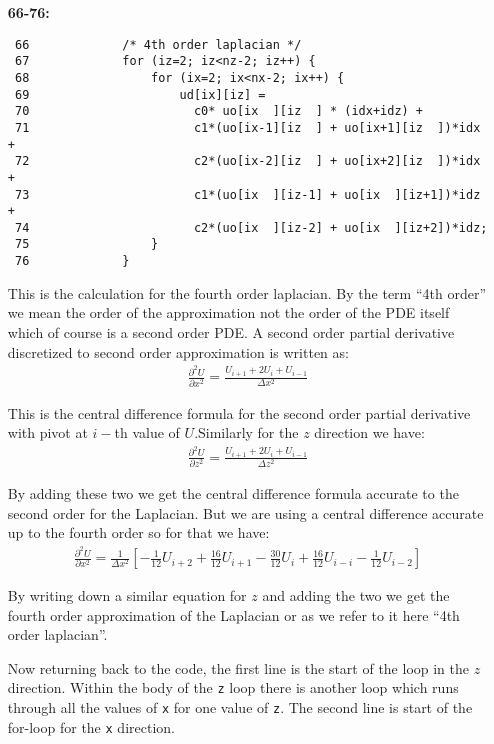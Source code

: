 \begin{itemize}
\item [\bf 66-76:]
\begin{verbatim}
 66             /* 4th order laplacian */
 67             for (iz=2; iz<nz-2; iz++) {
 68                 for (ix=2; ix<nx-2; ix++) {
 69                     ud[ix][iz] = 
 70                       c0* uo[ix  ][iz  ] * (idx+idz) + 
 71                       c1*(uo[ix-1][iz  ] + uo[ix+1][iz  ])*idx +
 72                       c2*(uo[ix-2][iz  ] + uo[ix+2][iz  ])*idx +
 73                       c1*(uo[ix  ][iz-1] + uo[ix  ][iz+1])*idz +
 74                       c2*(uo[ix  ][iz-2] + uo[ix  ][iz+2])*idz;	  
 75                 }
 76             }
\end{verbatim}

This is the calculation for the fourth order laplacian. By the term ``4th order'' we mean the order of the approximation not the order of the PDE itself which of course is a second order PDE. A second order partial derivative discretized to second order approximation is written as:
\begin{gather*}
    \frac{\partial^2U}{\partial x^2} = \frac{U_{i+1} + 2U_i + U_{i-1}}{\Delta x^2}
\end{gather*}
     
This is the central difference formula for the second order partial derivative with pivot at $i-$th value of $U$.Similarly for the $z$ direction we have:
\begin{gather*}
    \frac{\partial^2U}{\partial z^2} = \frac{U_{i+1} + 2U_i + U_{i-1}}{\Delta z^2}
\end{gather*}

By adding these two we get the central difference formula accurate to the second order for the Laplacian. But we are using a central difference accurate up to the fourth order so for that          we have:
\begin{gather*}
    \frac{\partial^2U}{\partial x^2} = \frac{1}{\Delta x^2}
                                       \left[-\frac{1}{12}U_{i+2}+ \frac{16}{12}U_{i+1} 
                                         -\frac{30}{12}U_i   + \frac{16}{12}U_{i-i} 
                                         - \frac{1}{12}U_{i-2}\right]
\end{gather*}

By writing down a similar equation for $z$ and adding the two  we get the fourth order approximation of the Laplacian or as we refer to it here ``4th order laplacian''.

Now returning back to the code, the first line is the start of the loop in the $z$ direction. Within the body of the \texttt{z} loop there is another loop which runs through all the values of \texttt{x} for one value of \texttt{z}. The second line is start of the for-loop for the \texttt{x} direction. 
           

\end{itemize}
